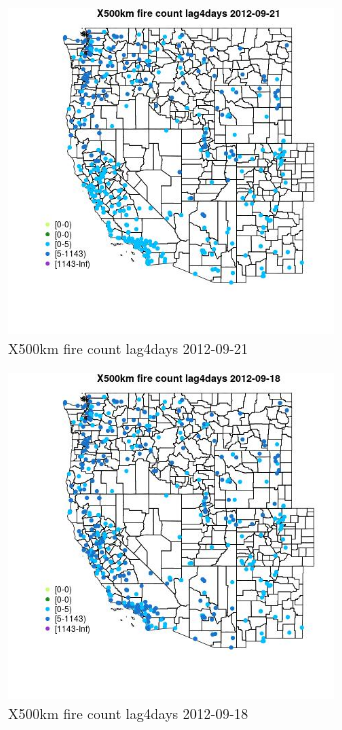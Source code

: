 \begin{figure} 
\centering  
\includegraphics[width=0.77\textwidth]{Code_Outputs/Report_ML_input_PM25_Step4_part_e_de_duplicated_aves_compiled_2019-05-14wNAs_MapObsX500km_fire_count_lag4days2012-09-21.jpg} 
\caption{\label{fig:Report_ML_input_PM25_Step4_part_e_de_duplicated_aves_compiled_2019-05-14wNAsMapObsX500km_fire_count_lag4days2012-09-21}X500km fire count lag4days 2012-09-21} 
\end{figure} 
 

\begin{figure} 
\centering  
\includegraphics[width=0.77\textwidth]{Code_Outputs/Report_ML_input_PM25_Step4_part_e_de_duplicated_aves_compiled_2019-05-14wNAs_MapObsX500km_fire_count_lag4days2012-09-18.jpg} 
\caption{\label{fig:Report_ML_input_PM25_Step4_part_e_de_duplicated_aves_compiled_2019-05-14wNAsMapObsX500km_fire_count_lag4days2012-09-18}X500km fire count lag4days 2012-09-18} 
\end{figure} 
 

